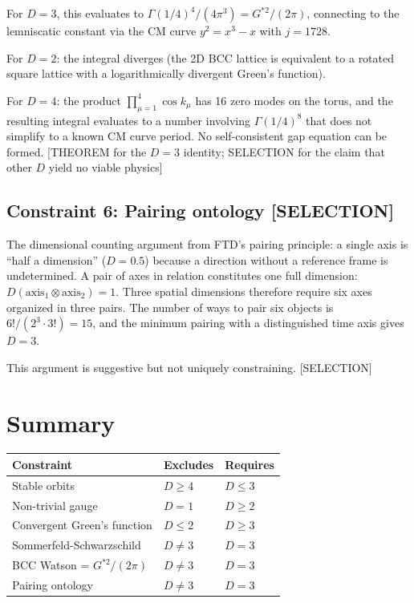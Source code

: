 \documentclass[
  11pt,
  letterpaper,
  twoside,
  openany]{book}
\makeatletter
\let\orig@section\section
\renewcommand{\section}{\needspace{8\baselineskip}\orig@section}
\let\orig@subsection\subsection
\renewcommand{\subsection}{\needspace{6\baselineskip}\orig@subsection}
\newcommand{\Gssq}{G^{*2}{}}      %
\makeatother
\begin{document}
For \(D = 3\), this evaluates to
\(\Gamma(1/4)^4 / (4\pi^3) = \Gssq/(2\pi)\), connecting to the
lemniscatic constant via the CM curve \(y^2 = x^3 - x\) with
\(j = 1728\).

For \(D = 2\): the integral diverges (the 2D BCC lattice is equivalent
to a rotated square lattice with a logarithmically divergent Green's
function).

For \(D = 4\): the product \(\prod_{\mu=1}^4 \cos k_\mu\) has 16 zero
modes on the torus, and the resulting integral evaluates to a number
involving \(\Gamma(1/4)^8\) that does not simplify to a known CM curve
period. No self-consistent gap equation can be formed. {[}THEOREM for
the \(D = 3\) identity; SELECTION for the claim that other \(D\) yield
no viable physics{]}

\subsection{Constraint 6: Pairing ontology
{[}SELECTION{]}}\label{constraint-6-pairing-ontology-selection}

The dimensional counting argument from FTD's pairing principle: a single
axis is ``half a dimension'' (\(D = 0.5\)) because a direction without a
reference frame is undetermined. A pair of axes in relation constitutes
one full dimension: \(D(\text{axis}_1 \otimes \text{axis}_2) = 1\).
Three spatial dimensions therefore require six axes organized in three
pairs. The number of ways to pair six objects is
\(6!/(2^3 \cdot 3!) = 15\), and the minimum pairing with a distinguished
time axis gives \(D = 3\).

This argument is suggestive but not uniquely constraining.
{[}SELECTION{]}

\section{Summary}\label{summary}

\begin{longtable}[]{@{}lll@{}}
\toprule\noalign{}
Constraint & Excludes & Requires \\
\midrule\noalign{}
\endhead
\bottomrule\noalign{}
\endlastfoot
Stable orbits & \(D \geq 4\) & \(D \leq 3\) \\
Non-trivial gauge & \(D = 1\) & \(D \geq 2\) \\
Convergent Green's function & \(D \leq 2\) & \(D \geq 3\) \\
Sommerfeld-Schwarzschild & \(D \neq 3\) & \(D = 3\) \\
BCC Watson = \(\Gssq/(2\pi)\) & \(D \neq 3\) & \(D = 3\) \\
Pairing ontology & \(D \neq 3\) & \(D = 3\) \\
\end{longtable}
\end{document}
